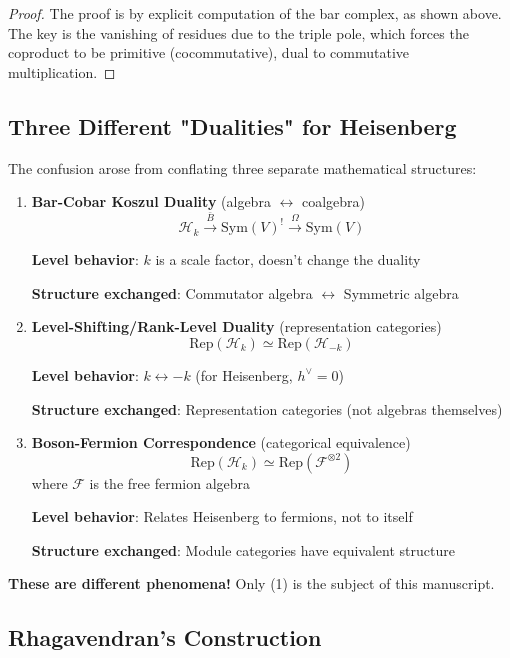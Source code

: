 \begin{proof}
The proof is by explicit computation of the bar complex, as shown above. The key is the 
vanishing of residues due to the triple pole, which forces the coproduct to be primitive 
(cocommutative), dual to commutative multiplication.
\end{proof}

\subsection{Three Different "Dualities" for Heisenberg}

The confusion arose from conflating three separate mathematical structures:

\begin{enumerate}
\item \textbf{Bar-Cobar Koszul Duality} (algebra $\leftrightarrow$ coalgebra)
   $$\mathcal{H}_k \xrightarrow{\bar{B}} \text{Sym}(V)^! \xrightarrow{\Omega} \text{Sym}(V)$$
   
   \textbf{Level behavior}: $k$ is a scale factor, doesn't change the duality
   
   \textbf{Structure exchanged}: Commutator algebra $\leftrightarrow$ Symmetric algebra

\item \textbf{Level-Shifting/Rank-Level Duality} (representation categories)
   $$\text{Rep}(\mathcal{H}_k) \simeq \text{Rep}(\mathcal{H}_{-k})$$
   
   \textbf{Level behavior}: $k \leftrightarrow -k$ (for Heisenberg, $h^{\vee} = 0$)
   
   \textbf{Structure exchanged}: Representation categories (not algebras themselves)

\item \textbf{Boson-Fermion Correspondence} (categorical equivalence)
   $$\text{Rep}(\mathcal{H}_k) \simeq \text{Rep}(\mathcal{F}^{\otimes 2})$$
   where $\mathcal{F}$ is the free fermion algebra
   
   \textbf{Level behavior}: Relates Heisenberg to fermions, not to itself
   
   \textbf{Structure exchanged}: Module categories have equivalent structure
\end{enumerate}

\textbf{These are different phenomena!} Only (1) is the subject of this manuscript.

\subsection{Rhagavendran's Construction}

